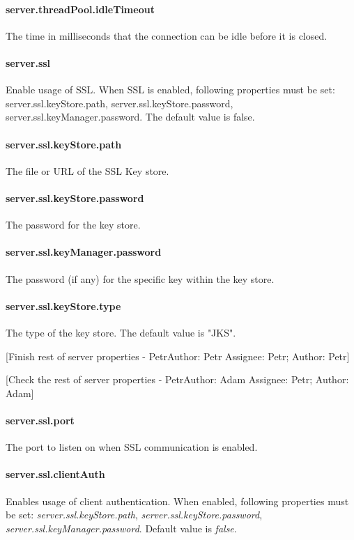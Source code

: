 \documentclass[12pt,a4paper]{report}
\makeatletter
\newcommand{\comment}[3][\@empty]{
  {\color{magenta}[#3 - }
  {\color{green}\ifx\@empty#1\relax Author: #2 \else Assignee: #1; Author: #2\fi}{\color{magenta}]}
}
\makeatother
\begin{document}
\paragraph{server.threadPool.idleTimeout}
The time in milliseconds that the connection can be idle before it is closed.

\paragraph{server.ssl}
Enable usage of SSL. When SSL is enabled, following properties must be set:
server.ssl.keyStore.path, server.ssl.keyStore.password, server.ssl.keyManager.password.
The default value is false.

\paragraph{server.ssl.keyStore.path}
The file or URL of the SSL Key store.
\paragraph{server.ssl.keyStore.password}
The password for the key store.
\paragraph{server.ssl.keyManager.password}
The password (if any) for the specific key within the key store.
\paragraph{server.ssl.keyStore.type}
The type of the key store. The default value is "JKS".

\comment[Petr]{Petr}{Finish rest of server properties}
\comment[Petr]{Adam}{Check the rest of server properties}
\paragraph{server.ssl.port}
The port to listen on when SSL communication is enabled.

\paragraph{server.ssl.clientAuth}
Enables usage of client authentication. When enabled, following properties must
be set: \emph{server.ssl.keyStore.path}, \emph{server.ssl.keyStore.password},
\emph{server.ssl.keyManager.password}. Default value is \emph{false}.
\end{document}

